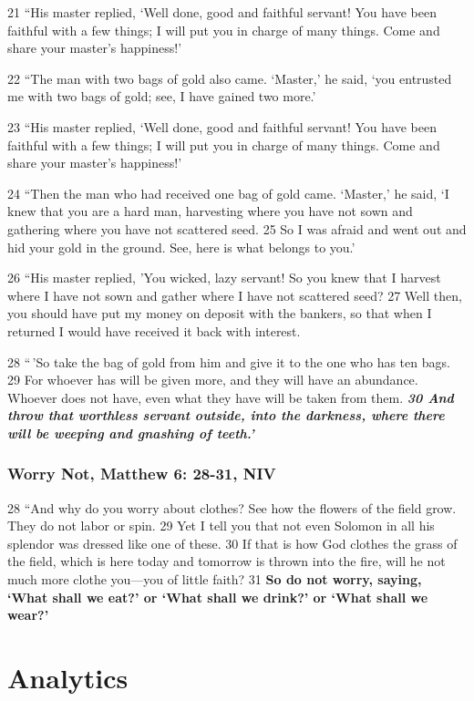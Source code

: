 \documentclass[
]{book}
\begin{document}
21 ``His master replied, `Well done, good and faithful servant! You have been faithful with a few things; I will put you in charge of many things. Come and share your master's happiness!'

22 ``The man with two bags of gold also came. `Master,' he said, `you entrusted me with two bags of gold; see, I have gained two more.'

23 ``His master replied, `Well done, good and faithful servant! You have been faithful with a few things; I will put you in charge of many things. Come and share your master's happiness!'

24 ``Then the man who had received one bag of gold came. `Master,' he said, `I knew that you are a hard man, harvesting where you have not sown and gathering where you have not scattered seed. 25 So I was afraid and went out and hid your gold in the ground. See, here is what belongs to you.'

26 ``His master replied, 'You wicked, lazy servant! So you knew that I harvest where I have not sown and gather where I have not scattered seed? 27 Well then, you should have put my money on deposit with the bankers, so that when I returned I would have received it back with interest.

28 ``\,'So take the bag of gold from him and give it to the one who has ten bags. 29 For whoever has will be given more, and they will have an abundance. Whoever does not have, even what they have will be taken from them. \textbf{\emph{30 And throw that worthless servant outside, into the darkness, where there will be weeping and gnashing of teeth.'}}

\hypertarget{worry-not-matthew-6-28-31-niv}{%
\subsection{Worry Not, Matthew 6: 28-31, NIV}\label{worry-not-matthew-6-28-31-niv}}

28 ``And why do you worry about clothes? See how the flowers of the field grow. They do not labor or spin. 29 Yet I tell you that not even Solomon in all his splendor was dressed like one of these. 30 If that is how God clothes the grass of the field, which is here today and tomorrow is thrown into the fire, will he not much more clothe you---you of little faith? 31 \textbf{So do not worry, saying, `What shall we eat?' or `What shall we drink?' or `What shall we wear?'}

\hypertarget{analytics}{%
\chapter{Analytics}\label{analytics}}
\end{document}
